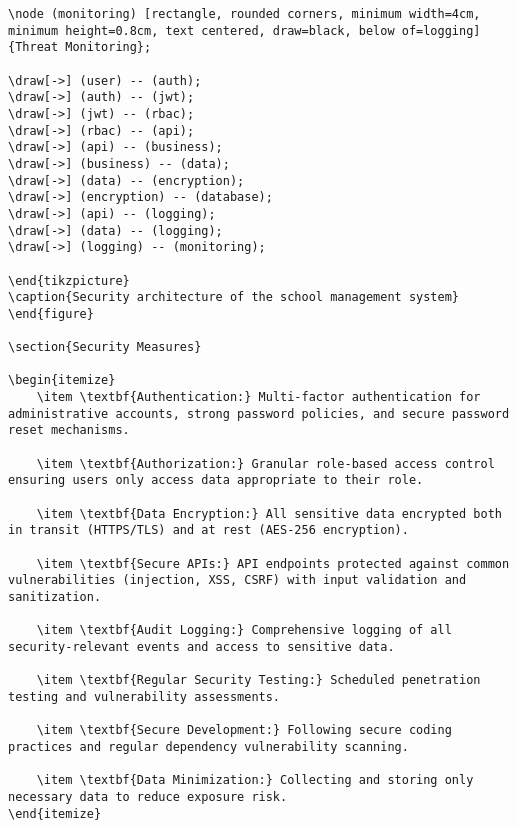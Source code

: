 \documentclass[11pt]{report}
\begin{document}
\begin{verbatim}
\node (monitoring) [rectangle, rounded corners, minimum width=4cm, minimum height=0.8cm, text centered, draw=black, below of=logging] {Threat Monitoring};

\draw[->] (user) -- (auth);
\draw[->] (auth) -- (jwt);
\draw[->] (jwt) -- (rbac);
\draw[->] (rbac) -- (api);
\draw[->] (api) -- (business);
\draw[->] (business) -- (data);
\draw[->] (data) -- (encryption);
\draw[->] (encryption) -- (database);
\draw[->] (api) -- (logging);
\draw[->] (data) -- (logging);
\draw[->] (logging) -- (monitoring);

\end{tikzpicture}
\caption{Security architecture of the school management system}
\end{figure}

\section{Security Measures}

\begin{itemize}
    \item \textbf{Authentication:} Multi-factor authentication for administrative accounts, strong password policies, and secure password reset mechanisms.
    
    \item \textbf{Authorization:} Granular role-based access control ensuring users only access data appropriate to their role.
    
    \item \textbf{Data Encryption:} All sensitive data encrypted both in transit (HTTPS/TLS) and at rest (AES-256 encryption).
    
    \item \textbf{Secure APIs:} API endpoints protected against common vulnerabilities (injection, XSS, CSRF) with input validation and sanitization.
    
    \item \textbf{Audit Logging:} Comprehensive logging of all security-relevant events and access to sensitive data.
    
    \item \textbf{Regular Security Testing:} Scheduled penetration testing and vulnerability assessments.
    
    \item \textbf{Secure Development:} Following secure coding practices and regular dependency vulnerability scanning.
    
    \item \textbf{Data Minimization:} Collecting and storing only necessary data to reduce exposure risk.
\end{itemize}


\end{verbatim}
\end{document}
